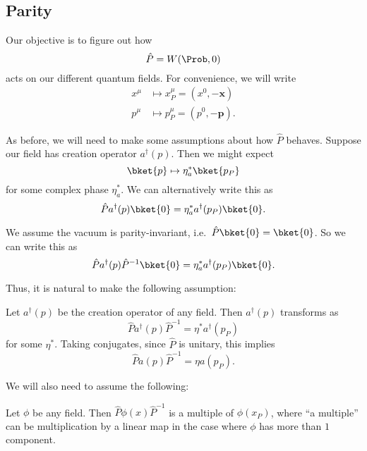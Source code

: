 \documentclass[a4paper]{article}
\begin{document}
\subsection{Parity}
Our objective is to figure out how
\[
  \hat{P} = W(\Prob, 0)
\]
acts on our different quantum fields. For convenience, we will write
\begin{align*}
  x^\mu &\mapsto x^\mu_P = (x^0, -\mathbf{x})\\
  p^\mu &\mapsto p^\mu_P = (p^0, -\mathbf{p}).
\end{align*}

As before, we will need to make some assumptions about how $\hat{P}$ behaves. Suppose our field has creation operator $a^\dagger(p)$. Then we might expect
\[
  \bket{p} \mapsto \eta^*_a\bket{p_P}
\]
for some complex phase $\eta^*_a$. We can alternatively write this as
\[
  \hat{P}a^\dagger(p) \bket{0} = \eta_a^* a^\dagger(p_P)\bket{0}.
\]

We assume the vacuum is parity-invariant, i.e.\ $\hat{P}\bket{0} = \bket{0}$. So we can write this as
\[
  \hat{P}a^\dagger(p) \hat{P}^{-1}\bket{0} = \eta_a^* a^\dagger(p_P) \bket{0}.
\]

Thus, it is natural to make the following assumption:

\begin{assumption}
  Let $a^\dagger(p)$ be the creation operator of any field. Then $a^\dagger(p)$ transforms as
  \[
    \hat{P} a^\dagger (p) \hat{P}^{-1} = \eta^* a^\dagger(p_P)
  \]
  for some $\eta^*$. Taking conjugates, since $\hat{P}$ is unitary, this implies
  \[
    \hat{P} a(p) \hat{P}^{-1} = \eta a(p_P).
  \]
\end{assumption}
We will also need to assume the following:
\begin{assumption}
  Let $\phi$ be any field. Then $\hat{P} \phi(x) \hat{P}^{-1}$ is a multiple of $\phi(x_P)$, where ``a multiple'' can be multiplication by a linear map in the case where $\phi$ has more than $1$ component.
\end{assumption}
\end{document}

